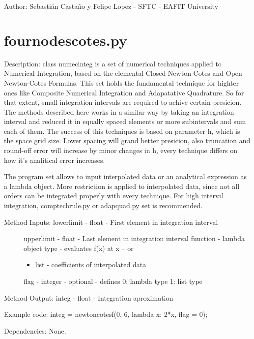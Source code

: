 \documentclass[letterpaper,10pt,oneside]{sphinxmanual}
\theoremstyle{plain}%
\theoremstyle{definition}%
\theoremstyle{remark}%
\begin{document}
Author: Sebastián Castaño y Felipe Lopez - SFTC - EAFIT University


\section{fournodescotes.py}
\label{code:fournodescotes-py}\label{code:module-fournodescotes}
Description: class numecinteg is a set of numerical techniques applied to
Numerical Integration, based on the elemental Closed Newton-Cotes and
Open Newton-Cotes Formulas. This set holds the fundamental technique for
highter ones like Composite Numerical Integration and Adapatative Quadrature.
So for that extent, small integration intervals are required to achive certain
presicion. The methods described here works in a similar way by taking an
integration interval and reduced it in equally spaced elements or more 
subintervals and sum each of them. The success of this techniques is based
on parameter h, which is the space grid size. Lower spacing will grand better
presicion, also truncation and round-off error will increase by minor changes
in h, every technique differs on how it's analitical error increases.

The program set allows to input interpolated data or an analytical expression
as a lambda object. More restriction is applied to interpolated data, since
not all orders can be integrated properly with every technique. For high 
interval integration, comptechrule.py or adapquad.py set is recommended.
\begin{description}
\item[{Method Inputs: lowerlimit - float - First element in integration interval}] \leavevmode
upperlimit - float - Last element in integration interval
function - lambda object type - evaluates f(x) at x -- or
\begin{itemize}
\item {} 
list - coefficients of interpolated data

\end{itemize}

flag - integer - optional - defines 0: lambda type 1: list type

\end{description}

Method Output: integ - float - Integration aproximation

Example code: integ = newtoncotesf(0, 6, lambda x: 2*x, flag = 0);

Dependencies: None.
\end{document}
